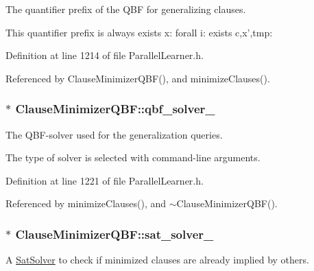 The quantifier prefix of the Q\-B\-F for generalizing clauses. 

This quantifier prefix is always exists x\-: forall i\-: exists c,x',tmp\-: 

Definition at line 1214 of file Parallel\-Learner.\-h.



Referenced by Clause\-Minimizer\-Q\-B\-F(), and minimize\-Clauses().

\hypertarget{classClauseMinimizerQBF_abca59a55100d8667effffdd26da5c7f7}{
\subsubsection[{qbf\-\_\-solver\-\_\-}]{$\ast$ Clause\-Minimizer\-Q\-B\-F\-::qbf\-\_\-solver\-\_\-\hspace{0.3cm}{\ttfamily [protected]}}}\label{classClauseMinimizerQBF_abca59a55100d8667effffdd26da5c7f7}


The Q\-B\-F-\/solver used for the generalization queries. 

The type of solver is selected with command-\/line arguments. 

Definition at line 1221 of file Parallel\-Learner.\-h.



Referenced by minimize\-Clauses(), and $\sim$\-Clause\-Minimizer\-Q\-B\-F().

\hypertarget{classClauseMinimizerQBF_af0b9ee5117475b01e377f730fba6d4fb}{
\subsubsection[{sat\-\_\-solver\-\_\-}]{$\ast$ Clause\-Minimizer\-Q\-B\-F\-::sat\-\_\-solver\-\_\-\hspace{0.3cm}{\ttfamily [protected]}}}\label{classClauseMinimizerQBF_af0b9ee5117475b01e377f730fba6d4fb}


A \hyperlink{classSatSolver}{Sat\-Solver} to check if minimized clauses are already implied by others. 




